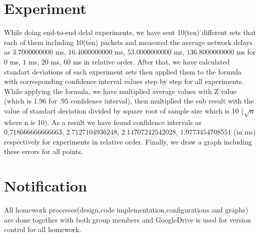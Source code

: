\documentclass[12pt]{article}
\begin{document}
\section*{Experiment}
While doing end-to-end delal experiments, we have sent 10(ten) different sets that each of them including 10(ten) packets and measured the average network delays as $3.7000000000$ ms, $16.4000000000$ ms, $53.0000000000$ ms, $136.8000000000$ ms for $0$ ms, $1$ ms, $20$ ms, $60$ ms in relative order. After that, we have calculated standart deviations of each experiment sets then applied them to the formula with corresponding confidence interval values step by step for all experiments. While applying the formula, we have multiplied average values with Z value (which is 1.96 for $.95$ confidence interval), then multiplied the sub result with the value of standart deviation divided by square root of sample size which is 10 ($\sqrt{n}$ where n is 10). As a result we have found confidence intervals as $0.718666666666663$, $2.7127104936248$, $2.14707242542028$, $1.9773454708551$ (in ms) respectively for experiments in relative order.
Finally, we draw a graph including these errors for all points.
\section*{Notification}
All homework processes(design,code implementation,configurations and graphs) are done together with both group members and GoogleDrive is used for version control for all homework.
\end{document}
